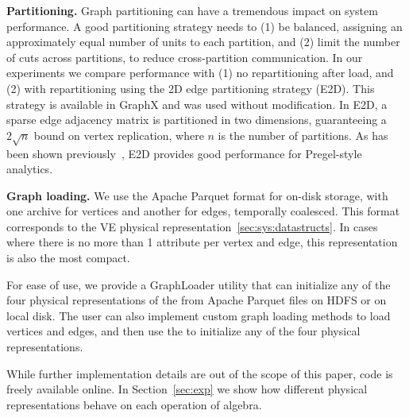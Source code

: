 {\bf Partitioning.}  Graph partitioning can have a tremendous impact
on system performance.  A good partitioning strategy needs to (1) be
balanced, assigning an approximately equal number of units to each
partition, and (2) limit the number of cuts across partitions, to
reduce cross-partition communication.  In our experiments we compare
performance with (1) no repartitioning after load, and (2) with
repartitioning using the 2D edge partitioning strategy (E2D).  This
strategy is available in GraphX and was used without modification.  In
E2D, a sparse edge adjacency matrix is partitioned in two dimensions,
guaranteeing a $2 \sqrt{n}$ bound on vertex replication, where $n$ is
the number of partitions. As has been shown
previously~\cite{DBLP:conf/osdi/GonzalezXDCFS14,MoffittTempWeb16}, E2D
provides good performance for Pregel-style analytics.

{\bf Graph loading.}  We use the Apache Parquet format for on-disk
storage, with one archive for vertices and another for edges,
temporally coalesced.  This format corresponds to the VE physical
representation~\ref{sec:sys:datastructs}.  In cases where there is no
more than 1 attribute per vertex and edge, this representation is also
the most compact.  

For ease of use, we provide a GraphLoader utility that can initialize
any of the four physical representations of the \tg from Apache
Parquet files on HDFS or on local disk.  The \ql user can also
implement custom graph loading methods to load vertices and edges, and
then use the  to initialize any of the four physical
representations.

 While further implementation
details are out of the scope of this paper, \ql code is freely
available online.  In Section~\ref{sec:exp} we show how different physical
representations behave on each operation of \tg algebra.



